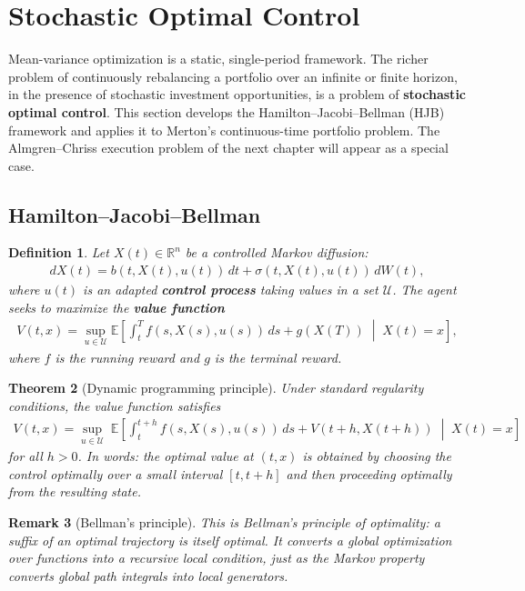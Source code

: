 \documentclass{report}
\theoremstyle{spacedplain}
\newtheorem{theorem}{Theorem}[section]
\theoremstyle{spaceddefinition}
\newtheorem{definition}[theorem]{Definition}
\theoremstyle{spacedremark}
\newtheorem{remark}[theorem]{Remark}
\begin{document}
\section{Stochastic Optimal Control}
 
Mean-variance optimization is a static, single-period framework. The richer problem of continuously rebalancing a portfolio over an infinite or finite horizon, in the presence of stochastic investment opportunities, is a problem of
\textbf{stochastic optimal control}. This section develops the
Hamilton--Jacobi--Bellman (HJB) framework and applies it to Merton's continuous-time portfolio problem. The Almgren--Chriss execution problem of the next chapter will appear as a special case.
 
\subsection{Hamilton--Jacobi--Bellman}
 
\begin{definition}
Let $X(t) \in \mathbb{R}^n$ be a controlled Markov diffusion:
\begin{align}
    dX(t) = b(t, X(t), u(t))\,dt + \sigma(t, X(t), u(t))\,dW(t),
\end{align}
where $u(t)$ is an adapted \textbf{control process} taking values in a set $\mathcal{U}$. The agent seeks to maximize the \textbf{value function}
\begin{align}
    V(t,x) = \sup_{u \in \mathcal{U}} \mathbb{E}\!\left[\int_t^T
    f(s, X(s), u(s))\,ds + g(X(T))\;\middle|\;X(t) = x\right],
\end{align}
where $f$ is the running reward and $g$ is the terminal reward.
\end{definition}
 
\begin{theorem}[Dynamic programming principle]
Under standard regularity conditions, the value function satisfies
\begin{align}
    V(t,x) = \sup_{u \in \mathcal{U}}\;\mathbb{E}\!\left[\int_t^{t+h}
    f(s,X(s),u(s))\,ds + V(t+h, X(t+h))\;\middle|\;X(t) = x\right]
\end{align}
for all $h > 0$. In words: the optimal value at $(t,x)$ is obtained by choosing the control optimally over a small interval $[t,t+h]$ and then proceeding optimally from the resulting state.
\end{theorem}
 
\begin{remark}[Bellman's principle]
This is Bellman's principle of optimality: a suffix of an optimal trajectory is itself optimal. It converts a global optimization over functions into a recursive local condition, just as the Markov property converts global path integrals into local generators.
\end{remark}
 
\end{document}
